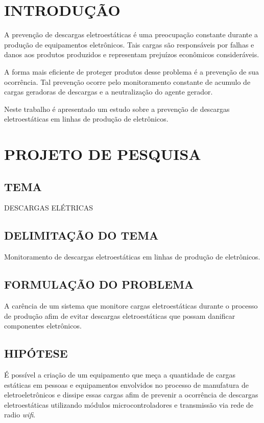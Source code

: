 \documentclass[
	12pt,				%
	openright,			%
	oneside,			%
	a4paper,			%
	chapter=TITLE,		%
	english,			%
	french,				%
	spanish,			%
	brazil,				%
	article,			%
	]{uea-abntex2}
\begin{document}
\chapter*{\vspace*{3.4cm}INTRODUÇÃO}
A prevenção de descargas eletroestáticas é uma preocupação constante durante a produção de equipamentos eletrônicos. Tais cargas são responsáveis por falhas e danos aos produtos produzidos e representam prejuízos econômicos consideráveis.

A forma mais eficiente de proteger produtos desse problema é a prevenção de sua ocorrência. Tal prevenção ocorre pelo monitoramento constante de acumulo de cargas geradoras de descargas e a neutralização do agente gerador.


Neste trabalho é apresentado um estudo sobre a prevenção de descargas eletroestáticas em linhas de produção de eletrônicos.


\newpage
\chapter*{\vspace*{3.4cm}PROJETO DE PESQUISA}

\vspace{24pt}
\section{TEMA}
DESCARGAS ELÉTRICAS
\section{DELIMITAÇÃO DO TEMA}
Monitoramento de descargas eletroestáticas em linhas de produção de eletrônicos.
\section{FORMULAÇÃO DO PROBLEMA}
A carência de um sistema que monitore cargas eletroestáticas durante o processo de produção afim de evitar descargas eletroestáticas que possam danificar componentes eletrônicos.  
\section{HIPÓTESE}
É possível a criação de um equipamento que meça a quantidade de cargas estáticas em pessoas e equipamentos envolvidos no processo de manufatura de eletroeletrônicos e dissipe essas cargas afim de prevenir a ocorrência de descargas eletroestáticas utilizando módulos microcontroladores e transmissão via rede de radio \textit{wifi}. 
\end{document}

